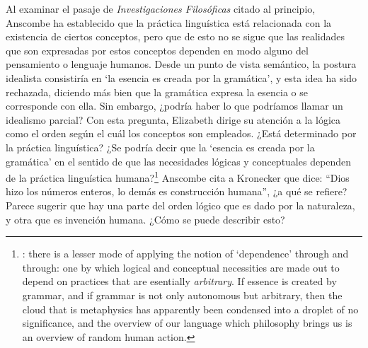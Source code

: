 Al examinar el pasaje de \emph{Investigaciones Filosóficas} citado al principio, Anscombe ha establecido que la práctica linguística está relacionada con la existencia de ciertos conceptos, pero que de esto no se sigue que las realidades que son expresadas por estos conceptos dependen en modo alguno del pensamiento o lenguaje humanos. Desde un punto de vista semántico, la postura idealista consistiría en \enquote*{la esencia es creada por la gramática}, y esta idea ha sido rechazada, diciendo más bien que la gramática expresa la esencia o se corresponde con ella. Sin embargo, ¿podría haber lo que podríamos llamar un idealismo parcial? Con esta pregunta, Elizabeth dirige su atención a la lógica como el orden según el cuál los conceptos son empleados. ¿Está determinado por la práctica linguística? ¿Se podría decir que la \enquote*{esencia es creada por la gramática} en el sentido de que las necesidades lógicas y conceptuales dependen de la práctica linguística humana?\footnote{\cite[Cf.~][220]{teichmann2008ans}: there is a lesser mode of applying the notion of `dependence' through and through: one by which logical and conceptual necessities are made out to depend on practices that are esentially \emph{arbitrary}. If essence is created by grammar, and if grammar is not only autonomous but arbitrary, then the cloud that is metaphysics has apparently been condensed into a droplet of no significance, and the overview of our language which philosophy brings us is an overview of random human action.} Anscombe cita a Kronecker que dice: ``Dios hizo los números enteros, lo demás es construcción humana'', ¿a qué se refiere? Parece sugerir que hay una parte del orden lógico que es dado por la naturaleza, y otra que es invención humana. ¿Cómo se puede describir esto?

